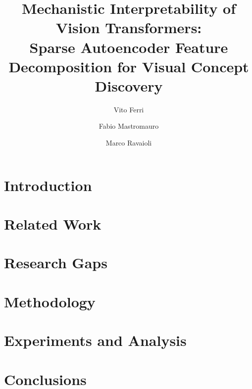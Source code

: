 \documentclass[sigconf, nonacm]{acmart}
\begin{document}
\title{Mechanistic Interpretability of Vision Transformers:\\
Sparse Autoencoder Feature Decomposition for Visual Concept Discovery}

\author{Vito Ferri}

\author{Fabio Mastromauro}

\author{Marco Ravaioli}

\begin{abstract}

\end{abstract}


\maketitle

\section{Introduction}


\section{Related Work}


\section{Research Gaps}


\section{Methodology}


\section{Experiments and Analysis}


\section{Conclusions}


\clearpage




\end{document}
